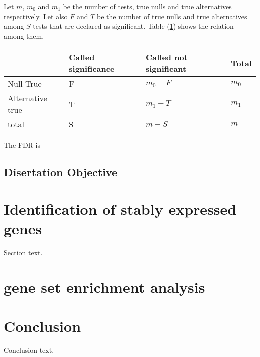 	Let $m$,  $m_0$  and $m_1$ be the number of tests,  true nulls  and true alternatives respectively. Let also $F$ and $T$ be the number of true nulls and true alternatives among $S$ tests that are declared as significant. Table (\ref{table1}) shows the  relation among them. 
	\begin{table}[h]\label{table1}\begin{center}
			\begin{tabular}{llll}
				& Called significance & Called not significant & Total  \\ \hline
				Null True &F &$m_0-F$  & $m_0$  \\
				Alternative true & T  & $m_1 -T$  & $m_1$  \\
				total & S & $m-S$  & $m$ \\ \hline
			\end{tabular}\end{center}
		\end{table} 
	The FDR is 


	\subsection{Disertation Objective}

\section{Identification of stably expressed genes}
Section text.

\section{gene set enrichment analysis}
\section{Conclusion}
Conclusion text.


\newpage


